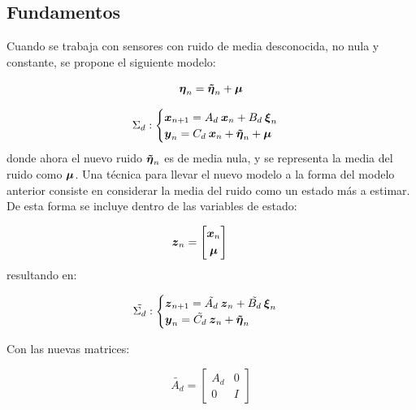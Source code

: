 \subsection{Fundamentos}

	Cuando se trabaja con sensores con ruido de media desconocida, no nula y constante, se propone el siguiente modelo:

	\begin{equation*}
		\boldsymbol{\eta}_{n} = \boldsymbol{\tilde{\eta}}_{n} + \boldsymbol{\mu}
	\end{equation*}

	\begin{equation*}
		\Sigma_{d}:
		\begin{cases}
			\boldsymbol{x}_{n + 1} = A_{d}\: \boldsymbol{x}_{n} + B_{d} \: \boldsymbol{\xi}_{n} \\
			\boldsymbol{y}_{n} = C_{d}\: \boldsymbol{x}_{n} + \boldsymbol{\tilde{\eta}}_{n} + \boldsymbol{\mu}
		\end{cases}
	\end{equation*}
	donde ahora el nuevo ruido $\boldsymbol{\tilde{\eta}}_{n}$ es de media nula, y se representa la media del ruido como $\boldsymbol{\mu}$. Una técnica para llevar el nuevo modelo a la forma del modelo anterior consiste en considerar la media del ruido como un estado más a estimar. De esta forma se incluye dentro de las variables de estado:

	\begin{equation*}
		\vect{z}_{n} = \begin{bmatrix} \vect{x}_{n} \\[0.3em] \vect{\mu}\end{bmatrix} \qquad%
	\end{equation*}
	resultando en:
	
	\begin{equation*}
		\tilde{\Sigma_{d}}:
		\begin{cases}
			\boldsymbol{z}_{n + 1} = \tilde{A_{d}}\: \boldsymbol{z}_{n} + \tilde{B_{d}} \: \boldsymbol{\xi}_{n} \\
			\boldsymbol{y}_{n} = \tilde{C_{d}}\: \boldsymbol{z}_{n} + \boldsymbol{\tilde{\eta}}_{n}
		\end{cases}
	\end{equation*}

	Con las nuevas matrices:
	
	\begin{equation*}
			\tilde{A_{d}} = \begin{bmatrix} A_{d} & 0 \\[0.3em] 0 & I \end{bmatrix}
	\end{equation*}
	
